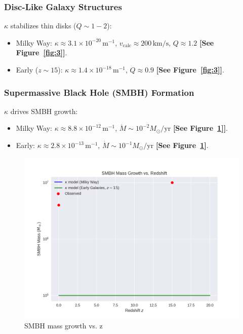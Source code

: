 \documentclass[a4paper,12pt]{article}
\begin{document}
\subsubsection{Disc-Like Galaxy Structures}
$\kappa$ stabilizes thin disks ($Q \sim 1-2$):
\begin{itemize}
    \item Milky Way: $\kappa \approx 3.1 \times 10^{-20} \, \text{m}^{-1}$, $v_\text{calc} \approx 200 \, \text{km/s}$, $Q \approx 1.2$ \citep{Carnall2024} \textbf{[See Figure~\ref{fig:3}]}.
    \item Early ($z \sim 15$): $\kappa \approx 1.4 \times 10^{-18} \, \text{m}^{-1}$, $Q \approx 0.9$ \citep{Boylan-Kolchin2023} \textbf{[See Figure~\ref{fig:3}]}.
\end{itemize}

\subsubsection{Supermassive Black Hole (SMBH) Formation}
$\kappa$ drives SMBH growth:
\begin{itemize}
    \item Milky Way: $\kappa \approx 8.8 \times 10^{-12} \, \text{m}^{-1}$, $\dot{M} \sim 10^{-2} M_\odot/\text{yr}$ \citep{Gebhardt2011} \textbf{[See Figure~\ref{fig:4}]]}.
    \item Early: $\kappa \approx 2.8 \times 10^{-13} \, \text{m}^{-1}$, $\dot{M} \sim 10^{-1} M_\odot/\text{yr}$ \citep{Curtis-Lake2023} \textbf{[See Figure~\ref{fig:4}]}.
\end{itemize}

\begin{figure}[H]
    \centering
    \includegraphics[width=0.8\linewidth]{figure4.png}
    \caption{SMBH mass growth vs. z}
    \label{fig:4}
\end{figure}
\end{document}
